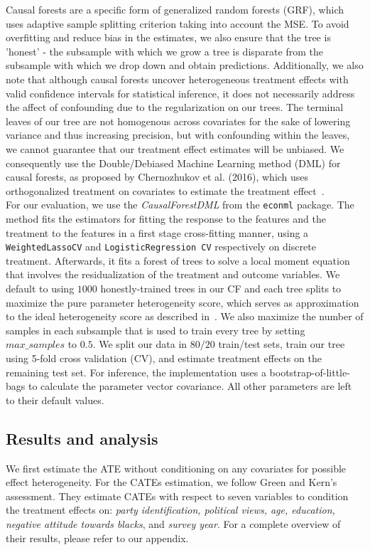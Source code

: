 \documentclass[12pt]{article}
\begin{document}
Causal forests are a specific form of generalized random forests (GRF), which
uses adaptive sample splitting criterion taking into account the MSE. To avoid
overfitting and reduce bias in the estimates, we also ensure that the tree is
'honest' - the subsample with which we grow a tree is disparate from the
subsample with which we drop down and obtain predictions. Additionally, we also
note that although causal forests uncover heterogeneous treatment effects with
valid confidence intervals for statistical inference, it does not necessarily
address the affect of confounding due to the regularization on our trees. The
terminal leaves of our tree are not homogenous across covariates for the sake of
lowering variance and thus increasing precision, but with confounding within the
leaves, we cannot guarantee that our treatment effect estimates will be
unbiased. We consequently use the Double/Debiased Machine Learning method (DML) for
causal forests, as proposed by Chernozhukov et al. (2016), which uses orthogonalized
treatment on covariates to estimate the treatment effect~\cite{DML}. 
\\

For our evaluation, we use the \textit{CausalForestDML} from the \texttt{econml}
package. The method fits the estimators for fitting the response to the features
and the treatment to the features in a first stage cross-fitting manner, using a
\texttt{WeightedLassoCV} and \texttt{LogisticRegression CV} respectively on
discrete treatment. Afterwards, it fits a forest of trees to solve a local
moment equation that involves the residualization of the treatment and outcome
variables. We default to using $1000$ honestly-trained trees in our CF and each
tree splits to maximize the pure parameter heterogeneity score, which serves as
approximation to the ideal heterogeneity score as described
in~\cite{athey2018grf}. We also maximize the number of samples in each subsample
that is used to train every tree by setting $max\_samples$ to $0.5$. We split
our data in $80/20$ train/test sets, train our tree using 5-fold cross
validation (CV), and estimate treatment effects on the remaining test set. For
inference, the implementation uses a bootstrap-of-little-bags to calculate the
parameter vector covariance. All other parameters are left to their default
values. 

\subsection{Results and analysis}
We first estimate the ATE without conditioning on any covariates for possible
effect heterogeneity. For the CATEs estimation, we follow Green and Kern's assessment. They estimate
CATEs with respect to seven variables to condition the treatment effects on:
\textit{party identification, political views, age, education, negative attitude
towards blacks}, and \textit{survey year}. For a complete overview of their
results, please refer to our appendix. \\ 
\end{document}
